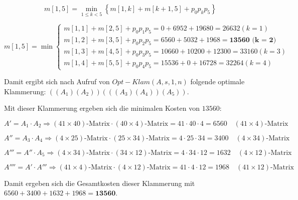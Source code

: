 \documentclass{article}
\begin{document}
\begin{equation}
m[1, 5] = \min\limits_{1 \leq k < 5} \left\{ m[1, k] + m[k + 1, 5] + p_0p_kp_5 \right\}
\end{equation}

\begin{equation}
m[1, 5] = \min\begin{cases}
  m[1, 1] + m[2, 5] + p_0p_1p_5 = 0 + 6952 + 19680 = 26632 (k = 1) \\
  m[1, 2] + m[3, 5] + p_0p_2p_5 = 6560 + 5032 + 1968 = \textbf{13560 (k = 2)} \\
  m[1, 3] + m[4, 5] + p_0p_3p_5 = 10660 + 10200 + 12300 = 33160 (k = 3) \\
  m[1, 4] + m[5, 5] + p_0p_4p_5 = 15536 + 0 + 16728 = 32264 (k = 4)
\end{cases}
\end{equation}

\clearpage

Damit ergibt sich nach Aufruf von $Opt-Klam(A, s, 1, n)$ folgende optimale
Klammerung:
$\left( \left( A_1 \right) \left( A_2 \right) \right) \left( \left( \left( A_3 \right) \left( A_4 \right) \right) \left( A_5 \right) \right)$.

Mit dieser Klammerung ergeben sich die minimalen Kosten von $13560$:

\begin{equation}
A' = A_1 \cdot A_2 \Rightarrow (41 \times 40)\text{-Matrix} \cdot (40 \times 4)\text{-Matrix} = 41 \cdot 40 \cdot 4 = 6560 \quad (41 \times 4)\text{-Matrix}
\end{equation}

\begin{equation}
A'' = A_3 \cdot A_4 \Rightarrow (4 \times 25)\text{-Matrix} \cdot (25 \times 34)\text{-Matrix} = 4 \cdot 25 \cdot 34 = 3400 \quad (4 \times 34)\text{-Matrix}
\end{equation}

\begin{equation}
A''' = A'' \cdot A_5 \Rightarrow (4 \times 34)\text{-Matrix} \cdot (34 \times 12)\text{-Matrix} = 4 \cdot 34 \cdot 12 = 1632 \quad (4 \times 12)\text{-Matrix}
\end{equation}

\begin{equation}
A'''' = A' \cdot A''' \Rightarrow (41 \times 4)\text{-Matrix} \cdot (4 \times 12)\text{-Matrix} = 41 \cdot 4 \cdot 12 = 1968 \quad (41 \times 12)\text{-Matrix}
\end{equation}

Damit ergeben sich die Gesamtkosten dieser Klammerung mit $6560 + 3400 + 1632 + 1968 = \textbf{13560}$.
\end{document}
